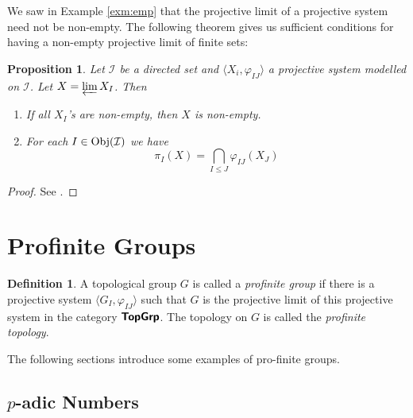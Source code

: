 \documentclass[12pt]{article}
\newtheorem{prop}[thm]{Proposition}
\theoremstyle{definition}
\newtheorem{dfn}[thm]{Definition}
\theoremstyle{remark}
\newcommand{\catvar}[1]{\mathcal{#1}}
\newcommand{\II}{\catvar{I}}
\newcommand{\catname}[1]{\textup{\sffamily\textbf{#1}}}
\newcommand{\Obj}[1]{\textup{Obj}(#1)}
\begin{document}
    We saw in Example \ref{exm:emp} that the projective limit of a projective system need not be non-empty. The following theorem gives us sufficient conditions for having a non-empty projective limit of finite sets:
    
    \begin{prop}
        Let $\II$ be a directed set and $\langle X_i,\varphi_{IJ}\rangle$ a projective system modelled on $\II$. Let $X=\varprojlim X_I$. Then
        \begin{enumerate}[label=(\roman*)]
            \item If all $X_I$'s are non-empty, then $X$ is non-empty.
            \item For each $I\in\Obj{\II}$ we have
            $$ \pi_I(X) =\bigcap_{I\leq J}\varphi_{IJ}(X_J) $$
        \end{enumerate}
    \end{prop}

    \begin{proof}
        See \cite[Proposition 1-11]{FANF1999}.
    \end{proof}

    \section{Profinite Groups}

    \begin{dfn}
        A topological group $G$ is called a \emph{profinite group} if there is a projective system $\langle G_I,\varphi_{IJ}\rangle$ such that $G$ is the projective limit of this projective system in the category $\catname{TopGrp}$. The topology on $G$ is called the \emph{profinite topology}.
    \end{dfn}

    The following sections introduce some examples of pro-finite groups.

    \subsection{\texorpdfstring{$p$}{p}-adic Numbers}

    
\end{document}
